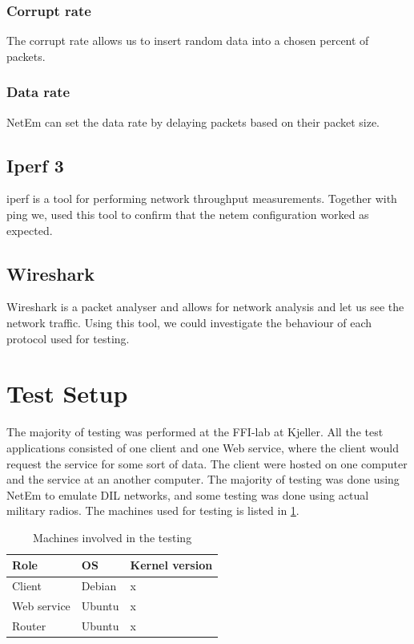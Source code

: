 \subsubsection{Corrupt rate}

The corrupt rate allows us to insert random data into a chosen percent of
packets.

\subsubsection{Data rate}

NetEm can set the data rate by delaying packets based on their packet size.

\subsection{Iperf 3}

iperf is a tool for performing network throughput measurements. Together with
ping we, used this tool to confirm that the \gls{netem} configuration worked as
expected.

\subsection{Wireshark}

Wireshark is a packet analyser and allows for network analysis and let us see
the network traffic. Using this tool, we could investigate the behaviour of each
protocol used for testing.



\section{Test Setup}
\label{testing-environment}

The majority of testing was performed at the FFI-lab at Kjeller. All the test
applications consisted of one client and one Web service, where the client would
request the service for some sort of data. The client were hosted on one
computer and the service at an another computer. The majority of testing was
done using NetEm to emulate DIL networks, and some testing was done using actual
military radios. The machines used for testing is listed in
\cref{table-machines}.

\begin{table}[h]
\begin{tabular}{| l | l | l |}
\hline
  \textbf{Role} & \textbf{OS} & \textbf{Kernel version}\\ \hline
  Client & Debian & x \\ \hline
  Web service & Ubuntu & x  \\ \hline
  Router & Ubuntu & x \\ \hline
\end{tabular}
\caption{Machines involved in the testing}
\label{table-machines}
\end{table}

